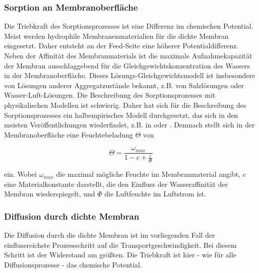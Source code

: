\begin{normalsize}
\subsubsection{Sorption an Membranoberfläche}
Die Triebkraft des Sorptionsprozesses ist eine Differenz im chemischen Potential. Meist werden hydrophile Membranenmaterialien für die dichte Membran eingesetzt. Daher entsteht an der Feed-Seite eine höherer Potentialdifferenz. Neben der Affinität des Membranmaterials ist die maximale Aufnahmekapazität der Membran ausschlaggebend für die Gleichgewichtskonzentration des Wassers in der Membranoberfläche. Dieses Lösungs-Gleichgewichtsmodell ist insbesondere von Lösungen anderer Aggregatzustände bekannt, z.B. von Salzlösungen oder Wasser-Luft-Lösungen. Die Beschreibung des Sorptionsprozesses mit physikalischen Modellen ist schwierig. Daher hat sich für die Beschreibung des Sorptionsprozesses ein halbempirisches Modell durchgesetzt, das sich in den meisten Veröffentlichungen wiederfindet, z.B. in \cite{J.L.Niu.2001} oder \cite{Dugaria.2015}. Demnach stellt sich in der Membranoberfläche eine Feuchtebeladung $\Theta$ von 

\begin{equation}
\Theta = \dfrac{\omega_{max}}{1-c+\frac{c}{\Phi}}
\end{equation}

ein. Wobei $\omega_{max}$ die maximal mögliche Feuchte im Membranmaterial angibt, $c$ eine Materialkonstante darstellt, die den Einfluss der Wasseraffinität der Membran wiederspiegelt, und $\Phi$ die Luftfeuchte im Luftstrom ist. 



\subsubsection{Diffusion durch dichte Membran}

Die Diffusion durch die dichte Membran ist im vorliegenden Fall der einflussreichste Prozessschritt auf die Transportgeschwindigkeit. Bei diesem Schritt ist der Widerstand am größten. Die Triebkraft ist hier - wie für alle Diffusionsprozesse - das chemische Potential. 


\end{normalsize}
